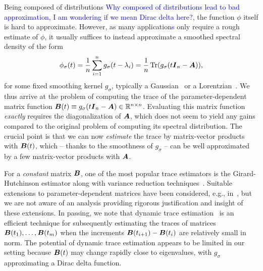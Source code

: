 Being composed of distributions \textcolor{blue}{Why composed of distributions lead to bad approximation, I am wondering if we mean Dirac delta here?}, the function $\phi$ itself is hard to approximate. However, as many application\textcolor{blue}{s} only require a rough estimate of $\phi$, it usually suffices to instead approximate a smoothed spectral density of the form
\begin{equation}
    \phi_{\sigma}(t) = \frac{1}{n} \sum_{i=1}^{n} g_{\sigma}(t - \lambda_i) = \frac{1}{n} \operatorname{Tr}(g_{\sigma}(t \boldsymbol{I}_n - \boldsymbol{A})),
    \label{equ:smoothed-spectral-density}
\end{equation}
for some fixed smoothing kernel $g_{\sigma}$, typically a Gaussian~\cite{lin-2016-approximating-spectral, lin-2017-randomized-estimation} or a Lorentzian~\cite{haydock-1972-electronic-structure, lin-2016-approximating-spectral}. We thus arrive at the problem of computing the trace of the parameter-dependent matrix function $\boldsymbol{B}(t) \equiv g_{\sigma}(t \boldsymbol{I}_n - \boldsymbol{A}) \in \mathbb{R}^{n \times n}$. Evaluating this matrix function \emph{exactly} requires the diagonalization of $\boldsymbol{A}$, which does not seem to yield any gains compared to the original problem of computing its spectral distribution. The crucial point is that we can now \emph{estimate} the trace by matrix-vector products with $\boldsymbol{B}(t)$, which -- thanks to the smoothness of $g_\sigma$ -- can be well approximated by a few matrix-vector products with $\boldsymbol{A}$.

For a \emph{constant} matrix $\boldsymbol{B}$, one of the most popular trace estimators is the Girard-Hutchinson estimator \cite{girard-1989-fast-montecarlo, hutchinson-1990-stochastic-estimator} along with variance reduction techniques~\cite{gambhir-2017-deflation-method, saibaba-2017-randomized-matrixfree, lin-2017-randomized-estimation, meyer-2021-hutch-optimal, persson-2022-improved-variants, chen-2023-krylovaware-stochastic, epperly-2024-xtrace-making}. Suitable extensions to parameter-dependent matrices have been considered, e.g., in~\cite{lin-2017-randomized-estimation,chen-2023-krylovaware-stochastic}, but we are not aware of an analysis providing rigorous justification and insight of these extensions. In passing, we note that dynamic trace estimation~\cite{dharangutte-2024-dynamic-trace,woodruff-2024-optimal-query} is an efficient technique for subsequently estimating the traces of matrices $\boldsymbol{B}(t_1), \dots, \boldsymbol{B}(t_m)$ when the increments $\boldsymbol{B}(t_{i+1}) - \boldsymbol{B}(t_i)$ are relatively small in norm. The potential of dynamic trace estimation appears to be limited in our setting because $\boldsymbol{B}(t)$ may change rapidly close to eigenvalues, with $g_{\sigma}$ approximating a Dirac delta function.

